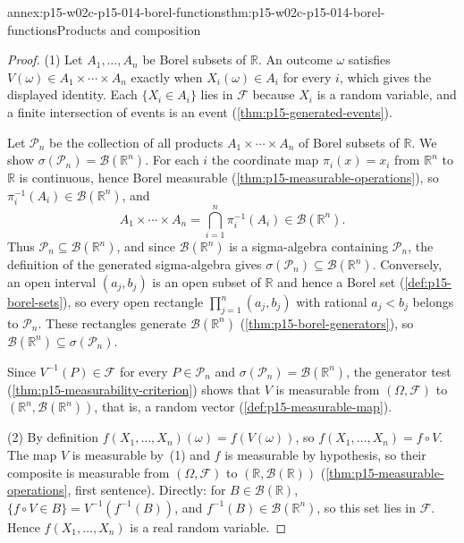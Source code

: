 \begin{annexitem}{annex:p15-w02c-p15-014-borel-functions}{thm:p15-w02c-p15-014-borel-functions}{Products and composition}
\begin{proof}
(1) Let \(A_1,\ldots,A_n\) be Borel subsets of \(\mathbb R\). An outcome
\(\omega\) satisfies \(V(\omega)\in A_1\times\cdots\times A_n\) exactly
when \(X_i(\omega)\in A_i\) for every \(i\), which gives the displayed
identity. Each \(\{X_i\in A_i\}\) lies in \(\mathcal F\) because \(X_i\)
is a random variable, and a finite intersection of events is an event
(\cref{thm:p15-generated-events}).

Let \(\mathcal P_n\) be the collection of all products
\(A_1\times\cdots\times A_n\) of Borel subsets of \(\mathbb R\). We show
\(\sigma(\mathcal P_n)=\mathcal B(\mathbb R^n)\). For each \(i\) the
coordinate map \(\pi_i(x)=x_i\) from \(\mathbb R^n\) to \(\mathbb R\) is
continuous, hence Borel measurable
(\cref{thm:p15-measurable-operations}), so
\(\pi_i^{-1}(A_i)\in\mathcal B(\mathbb R^n)\), and
\[
 A_1\times\cdots\times A_n=\bigcap_{i=1}^n\pi_i^{-1}(A_i)
 \in\mathcal B(\mathbb R^n).
\]
Thus \(\mathcal P_n\subseteq\mathcal B(\mathbb R^n)\), and since
\(\mathcal B(\mathbb R^n)\) is a sigma-algebra containing
\(\mathcal P_n\), the definition of the generated sigma-algebra gives
\(\sigma(\mathcal P_n)\subseteq\mathcal B(\mathbb R^n)\). Conversely, an
open interval \((a_j,b_j)\) is an open subset of \(\mathbb R\) and hence
a Borel set (\cref{def:p15-borel-sets}), so every open rectangle
\(\prod_{j=1}^n(a_j,b_j)\) with rational \(a_j<b_j\) belongs to
\(\mathcal P_n\). These rectangles generate \(\mathcal B(\mathbb R^n)\)
(\cref{thm:p15-borel-generators}), so
\(\mathcal B(\mathbb R^n)\subseteq\sigma(\mathcal P_n)\).

Since \(V^{-1}(P)\in\mathcal F\) for every \(P\in\mathcal P_n\) and
\(\sigma(\mathcal P_n)=\mathcal B(\mathbb R^n)\), the generator test
(\cref{thm:p15-measurability-criterion}) shows that \(V\) is measurable
from \((\Omega,\mathcal F)\) to \((\mathbb R^n,\mathcal B(\mathbb R^n))\),
that is, a random vector (\cref{def:p15-measurable-map}).

(2) By definition \(f(X_1,\ldots,X_n)(\omega)=f(V(\omega))\), so
\(f(X_1,\ldots,X_n)=f\circ V\). The map \(V\) is measurable by~(1) and
\(f\) is measurable by hypothesis, so their composite is measurable from
\((\Omega,\mathcal F)\) to \((\mathbb R,\mathcal B(\mathbb R))\)
(\cref{thm:p15-measurable-operations}, first sentence). Directly: for
\(B\in\mathcal B(\mathbb R)\),
\(\{f\circ V\in B\}=V^{-1}(f^{-1}(B))\), and
\(f^{-1}(B)\in\mathcal B(\mathbb R^n)\), so this set lies in
\(\mathcal F\). Hence \(f(X_1,\ldots,X_n)\) is a real random variable.


\end{proof}
\end{annexitem}
